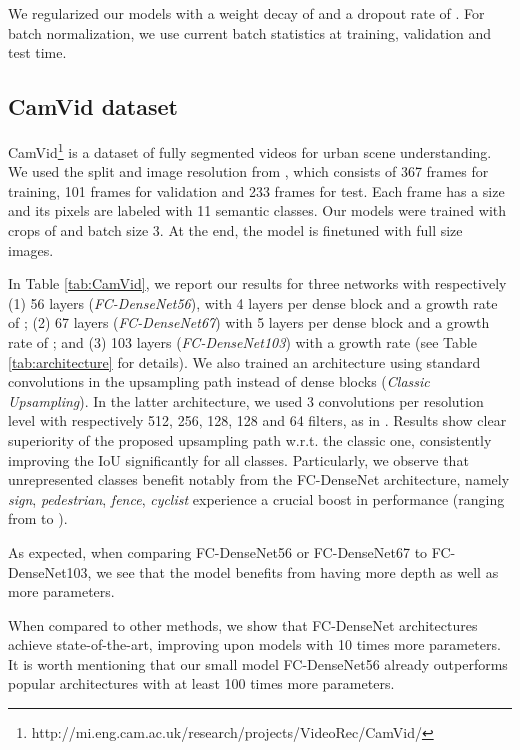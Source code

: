 \documentclass[10pt,twocolumn,letterpaper]{article}
\begin{document}
We regularized our models with a weight decay of  and a dropout rate of . For batch normalization, we use current batch statistics at training, validation and test time.


\subsection{CamVid dataset}

CamVid\footnote{http://mi.eng.cam.ac.uk/research/projects/VideoRec/CamVid/} \cite{camvid} is a dataset of fully segmented videos for urban scene understanding. We used the split and image resolution from \cite{SegNet2015}, which consists of 367 frames for training, 101 frames for validation and 233 frames for test. Each frame has a size  and its pixels are labeled with 11 semantic classes. Our models were trained with crops of  and batch size 3. At the end, the model is finetuned with full size images.

In Table \ref{tab:CamVid}, we report our results for three networks with respectively (1) 56 layers (\emph{FC-DenseNet56}), with 4 layers per dense block and a growth rate of ; (2) 67 layers (\emph{FC-DenseNet67}) with 5 layers per dense block and a growth rate of ; and (3) 103 layers (\emph{FC-DenseNet103}) with a growth rate  (see Table \ref{tab:architecture} for details). We also trained an architecture using standard convolutions in the upsampling path instead of dense blocks (\emph{Classic Upsampling}). In the latter architecture, we used 3 convolutions per resolution level with respectively 512, 256, 128, 128 and 64 filters, as in \cite{ronneberger2015u}. Results show clear superiority of the proposed upsampling path w.r.t. the classic one, consistently improving the IoU significantly for all classes. Particularly, we observe that unrepresented classes benefit notably from the FC-DenseNet architecture, namely \emph{sign}, \emph{pedestrian}, \emph{fence}, \emph{cyclist} experience a crucial boost in performance (ranging from  to ).

As expected, when comparing FC-DenseNet56 or FC-DenseNet67 to FC-DenseNet103, we see that the model benefits from having more depth as well as more parameters. 

When compared to other methods, we show that FC-DenseNet architectures achieve state-of-the-art, improving upon models with 10 times more parameters. It is worth mentioning that our small model FC-DenseNet56 already outperforms popular architectures with at least 100 times more parameters. 
\end{document}
